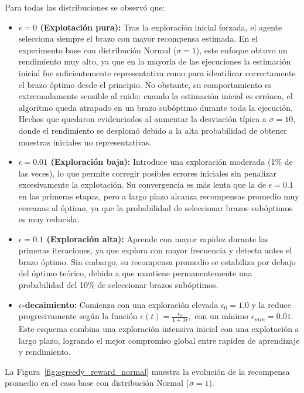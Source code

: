 Para todas las distribuciones se observó que:

\begin{itemize}
    \item \textbf{$\epsilon = 0$ (Explotación pura):} Tras la exploración inicial forzada, el agente selecciona siempre el brazo con mayor recompensa estimada. 
    En el experimento base con distribución Normal ($\sigma = 1$), este enfoque obtuvo un rendimiento muy alto, ya que en la mayoría de las ejecuciones la estimación inicial fue suficientemente representativa como para identificar correctamente el brazo óptimo desde el principio. 
    No obstante, su comportamiento es extremadamente sensible al ruido: cuando la estimación inicial es errónea, el algoritmo queda atrapado en un brazo subóptimo durante toda la ejecución. Hechos que quedaron evidenciados al aumentar la desviación típica a $\sigma = 10$, donde el rendimiento se desplomó debido a la alta probabilidad de obtener muestras iniciales no representativas.

    \item \textbf{$\epsilon = 0.01$ (Exploración baja):} Introduce una exploración moderada (1\% de las veces), lo que permite corregir posibles errores iniciales sin penalizar excesivamente la explotación. 
    Su convergencia es más lenta que la de $\epsilon=0.1$ en las primeras etapas, pero a largo plazo alcanza recompensas promedio muy cercanas al óptimo, ya que la probabilidad de seleccionar brazos subóptimos es muy reducida.

    \item \textbf{$\epsilon = 0.1$ (Exploración alta):} Aprende con mayor rapidez durante las primeras iteraciones, ya que explora con mayor frecuencia y detecta antes el brazo óptimo. 
    Sin embargo, su recompensa promedio se estabiliza por debajo del óptimo teórico, debido a que mantiene permanentemente una probabilidad del 10\% de seleccionar brazos subóptimos.

    \item \textbf{$\epsilon$-decaimiento:} Comienza con una exploración elevada $\epsilon_0 = 1.0$ y la reduce progresivamente según la función 
    $\epsilon(t) = \frac{\epsilon_0}{1 + \lambda t},$
    con un mínimo $\epsilon_{min}=0.01$. 
    Este esquema combina una exploración intensiva inicial con una explotación a largo plazo, logrando el mejor compromiso global entre rapidez de aprendizaje y rendimiento.
\end{itemize}

La Figura~\ref{fig:egreedy_reward_normal} muestra la evolución de la recompensa promedio en el caso base con distribución Normal ($\sigma=1$).

